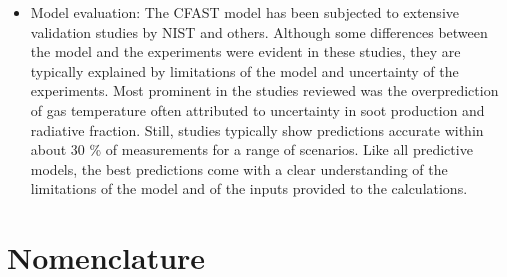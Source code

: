 \documentclass[12pt]{book}
\begin{document}
\begin{itemize}
\item Model evaluation: The CFAST model has been subjected to extensive validation studies
by NIST and others. Although some differences between the model and the experiments
were evident in these studies, they are typically explained by limitations of the model and
uncertainty of the experiments. Most prominent in the studies reviewed was the overprediction
of gas temperature often attributed to uncertainty in soot production and
radiative fraction. Still, studies typically show predictions accurate within about 30 \%
of measurements for a range of scenarios. Like all predictive models, the best predictions
come with a clear understanding of the limitations of the model and of the inputs
provided to the calculations.

\end{itemize}

\chapter{Nomenclature}
\end{document}
